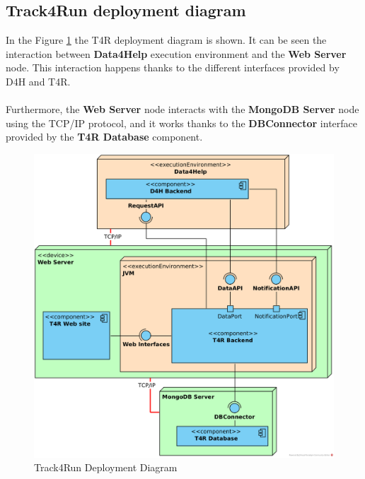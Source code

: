 \documentclass[a4paper, hidelinks, 12pt]{report}
\begin{document}
	\subsection{Track4Run deployment diagram}
	In the Figure \ref{fig:t4r_deployment_diagram} the T4R deployment diagram is shown. It can be seen the interaction between \textbf{Data4Help} execution environment and the \textbf{Web Server} node. This interaction happens thanks to the different interfaces provided by D4H and T4R. \\\\
	Furthermore, the \textbf{Web Server} node interacts with the \textbf{MongoDB Server} node using the TCP/IP protocol, and it works thanks to the \textbf{DBConnector} interface provided by the \textbf{T4R Database} component.
		\begin{figure}[H]
			\centering
			\includegraphics[width=1\textwidth]{diagrams/t4r_deployment_diagram.png}
			\caption[Track4Run Deployment Diagram]{Track4Run Deployment Diagram}
			\label{fig:t4r_deployment_diagram}
		\end{figure}	
		
\end{document}
